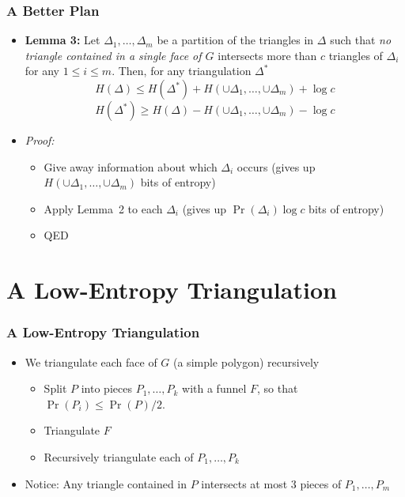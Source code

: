 \documentclass{beamer}
\begin{document}
\frame
{
    \frametitle{A Better Plan}

    \begin{itemize}
      \item<1-> \textbf{Lemma 3:} Let $\Delta_1,\ldots,\Delta_m$ be a
partition of the triangles in $\Delta$ such that \emph{no triangle
contained in a single face of $G$}
intersects more than $c$ triangles of $\Delta_i$ for any $1\le i\le
m$. Then, for any triangulation $\Delta^*$
\[
      H(\Delta) \le H(\Delta^*) + H(\cup\Delta_1,\ldots,\cup\Delta_m) + \log c
\]
\[
      H(\Delta^*) \ge H(\Delta) - H(\cup\Delta_1,\ldots,\cup\Delta_m) - \log c
\]
     \item<2-> \textit{Proof:} 
      \begin{itemize}
       \item<3-> Give away information about which $\Delta_i$ occurs
(gives up $H(\cup\Delta_1,\ldots,\cup\Delta_m)$ bits of entropy)
       \item<4-> Apply Lemma~2 to each $\Delta_i$ (gives up
           $\Pr(\Delta_i)\log c$ bits of entropy)
       \item<5-> QED
      \end{itemize} 
    \end{itemize}
}

\section{A Low-Entropy Triangulation}
\frame
{
   \frametitle{A Low-Entropy Triangulation}

   \begin{itemize}
     \item<1->We triangulate each face of $G$ (a simple polygon)
recursively
     \begin{center}
     \end{center}
     \begin{itemize}
     \item<2->Split $P$ into pieces $P_1,\ldots,P_k$ with a funnel $F$, so
that $\Pr(P_i) \le \Pr(P)/2$. 
     \item<3->Triangulate $F$
     \item<4->Recursively triangulate each of $P_1,\ldots,P_k$
     \end{itemize}
     \item<5->Notice: Any triangle contained in $P$ intersects at most
3 pieces of $P_1,\ldots,P_m$
   \end{itemize}
}
\end{document}
